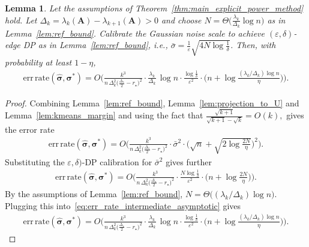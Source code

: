 \documentclass[10pt,a4paper]{amsart}
\newtheorem{lemma}{Lemma}
\begin{document}
\begin{lemma} \label{lem:power_aux}
Let the assumptions of Theorem~\ref{thm:main_explicit_power_method} hold. Let $\Delta_k=\lambda_k(\mathbf{A})-\lambda_{k+1}(\mathbf{A})>0$ and choose $N = \Theta \Big(\frac{\lambda_k}{\Delta_k}\log n\Big)$ as in Lemma~\ref{lem:ref_bound}. Calibrate the Gaussian noise scale to achieve $(\varepsilon,\delta)$-edge DP as in Lemma~\ref{lem:ref_bound}, i.e., $\bar\sigma = \frac{1}{\varepsilon}\sqrt{4N\log\frac{1}{\delta}}$.
Then, with probability at least $1-\eta$,
\begin{equation*}
\begin{aligned}
\mathrm{err\,rate}(\hat{\bm{\sigma}},\bm{\sigma}^\ast)
=  O \Bigg(
\frac{k^3}{n\,\Delta_k^2\bigl(\tfrac{\Delta_\star}{2}-r_\star\bigr)^2}
\cdot
\frac{\lambda_k}{\Delta_k}\,\log n
\cdot
\frac{\log\frac{1}{\delta}}{\varepsilon^2}
\cdot
\Big(n+\log\frac{(\lambda_k/\Delta_k)\log n}{\eta}\Big)
\Bigg).
\end{aligned}
\end{equation*}
\end{lemma}

\begin{proof}

Combining Lemma~\ref{lem:ref_bound},
Lemma~\ref{lem:projection_to_U} and Lemma~\ref{lem:kmeans_margin} and using the fact that 
$
\frac{\sqrt{k+1}}{\sqrt{k+1} - \sqrt{k}} = O(k),
$
gives the error rate
\begin{equation*}
\begin{aligned}
\mathrm{err\,rate}(\hat{\bm{\sigma}},\bm{\sigma}^\ast)
=  O \Bigg(
\frac{k^3}{n\,\Delta_k^2\bigl(\tfrac{\Delta_\star}{2}-r_\star\bigr)^2}
\cdot
\bar\sigma^2
\cdot
\Big(\sqrt{n}+\sqrt{2\log\frac{2N}{\eta}}\Big)^2
\Bigg).
\end{aligned}
\end{equation*}
Substituting the $\varepsilon,\delta)$-DP calibration for $\bar\sigma^2$ gives further
\begin{equation} \label{eq:err_rate_intermediate_asymptotic}
\begin{aligned}
\mathrm{err\,rate}(\hat{\bm{\sigma}},\bm{\sigma}^\ast)
=  O \Bigg(
\frac{k^3}{n\,\Delta_k^2\bigl(\tfrac{\Delta_\star}{2}-r_\star\bigr)^2}
\cdot
\frac{N\log\frac{1}{\delta}}{\varepsilon^2}
\cdot
\Big(n+\log\frac{2N}{\eta}\Big)
\Bigg).
\end{aligned}
\end{equation}
By the assumptions of Lemma~\ref{lem:ref_bound}, $N = \Theta\big((\lambda_k/\Delta_k)\log n\big)$. Plugging this into~\eqref{eq:err_rate_intermediate_asymptotic} gives
\begin{equation*}
\begin{aligned}
\mathrm{err\,rate}(\hat{\bm{\sigma}},\bm{\sigma}^\ast)
=  O \Bigg(
\frac{k^3}{n\,\Delta_k^2\bigl(\tfrac{\Delta_\star}{2}-r_\star\bigr)^2}
\cdot
\frac{\lambda_k}{\Delta_k}\,\log n
\cdot
\frac{\log\frac{1}{\delta}}{\varepsilon^2}
\cdot
\Big(n+\log\frac{(\lambda_k/\Delta_k)\log n}{\eta}\Big)
\Bigg).
\end{aligned}
\end{equation*}
\end{proof}
\end{document}
